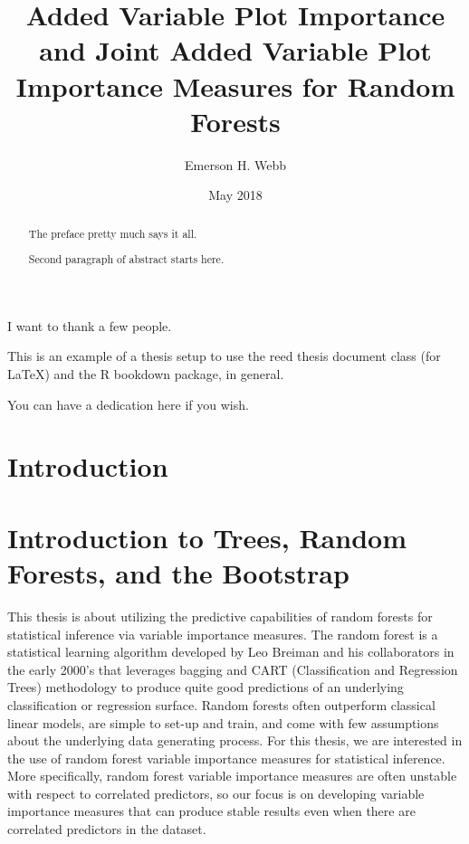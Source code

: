 \documentclass[12pt,twoside]{reedthesis}
\title{Added Variable Plot Importance and Joint Added Variable Plot Importance
Measures for Random Forests}
\author{Emerson H. Webb}
\date{May 2018}
\theoremstyle{definition}
\theoremstyle{definition}
\theoremstyle{definition}
\theoremstyle{remark}
\begin{document}
  \maketitle

\frontmatter %
\pagestyle{empty} %
  \begin{acknowledgements}
    I want to thank a few people.
  \end{acknowledgements}
  \begin{preface}
    This is an example of a thesis setup to use the reed thesis document
    class (for LaTeX) and the R bookdown package, in general.
  \end{preface}
  \hypersetup{linkcolor=black}
  \setcounter{tocdepth}{2}
  \tableofcontents

  \listoftables

  \listoffigures
  \begin{abstract}
    The preface pretty much says it all. \par
    
    Second paragraph of abstract starts here.
  \end{abstract}
  \begin{dedication}
    You can have a dedication here if you wish.
  \end{dedication}
\mainmatter %
\pagestyle{fancyplain} %

\chapter*{Introduction}\label{introduction}

\chapter{Introduction to Trees, Random Forests, and the
Bootstrap}\label{rmd-basics}

This thesis is about utilizing the predictive capabilities of random
forests for statistical inference via variable importance measures. The
random forest is a statistical learning algorithm developed by Leo
Breiman and his collaborators in the early 2000's that leverages bagging
and CART (Classification and Regression Trees) methodology to produce
quite good predictions of an underlying classification or regression
surface. Random forests often outperform classical linear models, are
simple to set-up and train, and come with few assumptions about the
underlying data generating process. For this thesis, we are interested
in the use of random forest variable importance measures for statistical
inference. More specifically, random forest variable importance measures
are often unstable with respect to correlated predictors, so our focus
is on developing variable importance measures that can produce stable
results even when there are correlated predictors in the dataset. \par
\end{document}
